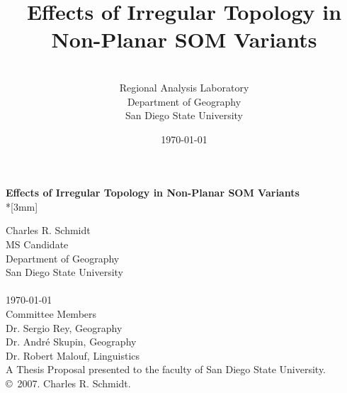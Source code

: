 \documentclass[10pt,titlepage]{article}
\title{Effects of Irregular Topology in Non-Planar SOM Variants}
\author{\sc{Charles R. Schmidt}\\Regional Analysis Laboratory\\Department of Geography\\San Diego State University}
\date{\today}
\begin{document}
\break
\begin{center}
{\Large{\bf Effects of Irregular Topology in Non-Planar SOM Variants}}\\*[3mm]
\end{center}
Charles R. Schmidt\\
MS Candidate\\
Department of Geography\\
San Diego State University\\\\
\today\\\break
Committee Members\\
Dr. Sergio Rey, Geography\\
Dr. Andr{\'e} Skupin, Geography\\
Dr. Robert Malouf, Linguistics\\\break
A Thesis Proposal presented to the faculty of San Diego State University.\\
\copyright~2007. Charles R. Schmidt. \\
%
\\
\tableofcontents
\newpage


%
\end{document}
